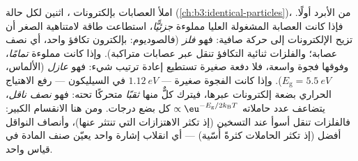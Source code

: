 \begin{definition}\label{def:b3:electrons-in-solids:classes}
املأ العصابات بإلكترونات ، اثنين لكل حالة
(\cref{ch:b3:identical-particles})، من الأبرد أولًا. فإذا كانت
العصابة المشغولة العليا مملوءة \emph{جزئيًّا}، استطاعت طاقة لامتناهية الصغر
أن تزيح الإلكترونات إلى حركة صافية: فهو \emph{فلز} (فالصوديوم: بإلكترون
تكافؤ واحد، أي نصف عصابة؛ والفلزات ثنائية التكافؤ تنقل عبر
عصابات متراكبة). وإذا كانت مملوءة \emph{تمامًا}، وفوقها فجوة واسعة،
فلا دفعة صغيرة تستطيع إعادة ترتيب شيء: فهو \emph{عازل}
(الألماس، $E_{\text{g}} = \qty{5.5}{eV}$). وإذا كانت الفجوة صغيرة ---
$\qty{1.12}{eV}$ في السيليكون --- رفع الاهتياج الحراري بضعة
إلكترونات عبرها، فيترك كلٌّ منها \emph{ثقبًا} متحركًا تحته: فهو
\emph{نصف ناقل}، يتضاعف عدد حاملاته
$\propto\eu^{-E_{\text{g}}/2k_{\text{B}}T}$ كل بضع
درجات. ومن هنا الانقسام الكبير: فالفلزات تنقل أسوأ عند التسخين
(إذ تكثر الاهتزازات التي تنتثر عنها)، وأنصاف النواقل أفضل
(إذ تكثر الحاملات كثرةً أُسّية) --- أي انقلاب إشارة واحد يعيّن
صنف المادة في قياس واحد.
\end{definition}

